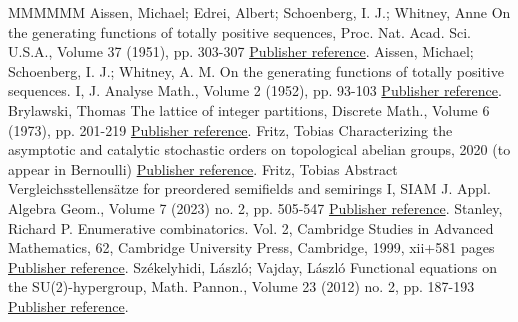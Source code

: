\begin{thebibliography}{MMMMMM}
 Aissen, Michael; Edrei, Albert; Schoenberg, I. J.; Whitney, Anne On the generating functions of totally positive sequences, Proc. Nat. Acad. Sci. U.S.A., Volume 37 (1951), pp. 303-307 \href{https://alco.centre-mersenne.org/articles/10.5802/alco.338/#totallypositive}{Publisher reference}.
 Aissen, Michael; Schoenberg, I. J.; Whitney, A. M. On the generating functions of totally positive sequences. I, J. Analyse Math., Volume 2 (1952), pp. 93-103 \href{https://alco.centre-mersenne.org/articles/10.5802/alco.338/#totallypositiveI}{Publisher reference}.
 Brylawski, Thomas The lattice of integer partitions, Discrete Math., Volume 6 (1973), pp. 201-219 \href{https://alco.centre-mersenne.org/articles/10.5802/alco.338/#brylawski}{Publisher reference}.
 Fritz, Tobias Characterizing the asymptotic and catalytic stochastic orders on topological abelian groups, 2020 (to appear in Bernoulli) \href{https://alco.centre-mersenne.org/articles/10.5802/alco.338/#random_walks}{Publisher reference}.
 Fritz, Tobias Abstract Vergleichsstellensätze for preordered semifields and semirings I, SIAM J. Appl. Algebra Geom., Volume 7 (2023) no. 2, pp. 505-547 \href{https://alco.centre-mersenne.org/articles/10.5802/alco.338/#vergleichsstellensatz}{Publisher reference}.
 Stanley, Richard P. Enumerative combinatorics. Vol. 2, Cambridge Studies in Advanced Mathematics, 62, Cambridge University Press, Cambridge, 1999, xii+581 pages \href{https://alco.centre-mersenne.org/articles/10.5802/alco.338/#stanley2}{Publisher reference}.
 Székelyhidi, László; Vajday, László Functional equations on the SU(2)-hypergroup, Math. Pannon., Volume 23 (2012) no. 2, pp. 187-193 \href{https://alco.centre-mersenne.org/articles/10.5802/alco.338/#SV}{Publisher reference}.
\end{thebibliography}
